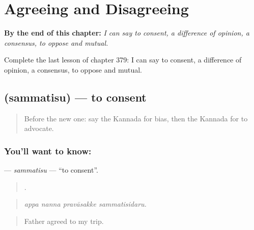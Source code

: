 
\chapter{Agreeing and Disagreeing}
\label{ch:ka-agreeing-and-disagreeing}

\begin{chapteropening}
\textbf{By the end of this chapter:} \emph{I can say to consent, a difference of opinion, a consensus, to oppose and mutual.}

Complete the last lesson of chapter 379: I can say to consent, a difference of opinion, a consensus, to oppose and mutual.
\end{chapteropening}

\section[\texorpdfstring{\kn{ಸಮ್ಮತಿಸು} (sammatisu)}{ಸಮ್ಮತಿಸು (sammatisu)}]{ (sammatisu) — to consent}

\label{lesson:KA-C379-sammatisu}



\begin{quote}
Before the new one: say the Kannada for bias, then the Kannada for to advocate.
\end{quote}

\subsection*{You'll want to know: }
\textbf{} — \emph{sammatisu} — \textquotedblleft{}to consent\textquotedblright{}.

\begin{quote}
   .
\end{quote}

\begin{quote}
\emph{appa nanna pravāsakke sammatisidaru.}
\end{quote}

\begin{quote}
Father agreed to my trip.
\end{quote}

